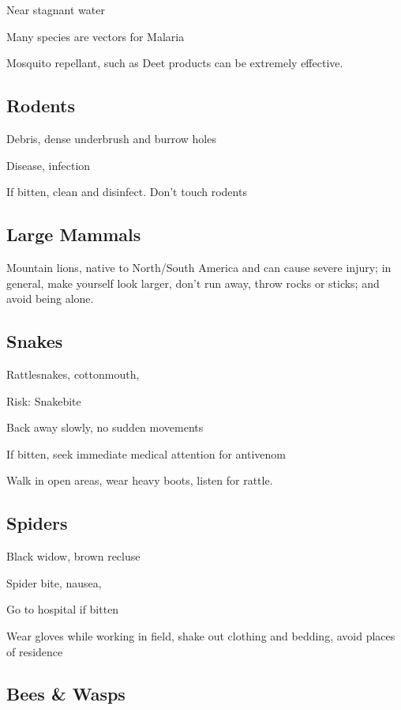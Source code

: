 \documentclass[12pt]{../SOP3_beta}\usepackage[]{graphicx}\usepackage[]{color}
\begin{document}
\NP Near stagnant water

\NP Many species are vectors for Malaria

\NP Mosquito repellant, such as Deet products can be extremely effective. 

  

\subsection{Rodents}

\NP Debris, dense underbrush and burrow holes

\NP Disease, infection

\NP If bitten, clean and disinfect.
\NP Don’t touch rodents


\subsection{Large Mammals}

\NP Mountain lions, native to North/South America and can cause severe injury; in general, make yourself look larger, don’t run away, throw rocks or sticks; and avoid being alone.


\subsection{Snakes}

\NP Rattlesnakes, cottonmouth, 

\NP Risk: Snakebite

\NP Back away slowly, no sudden movements

\NP If bitten, seek immediate medical attention for antivenom

\NP Walk in open areas, wear heavy boots, listen for rattle.

\subsection{Spiders}

\NP Black widow, brown recluse

\NP Spider bite, nausea, 

\NP Go to hospital if bitten

\NP Wear gloves while working in field, shake out clothing and bedding, avoid places of residence

\subsection{Bees \& Wasps}
\end{document}

